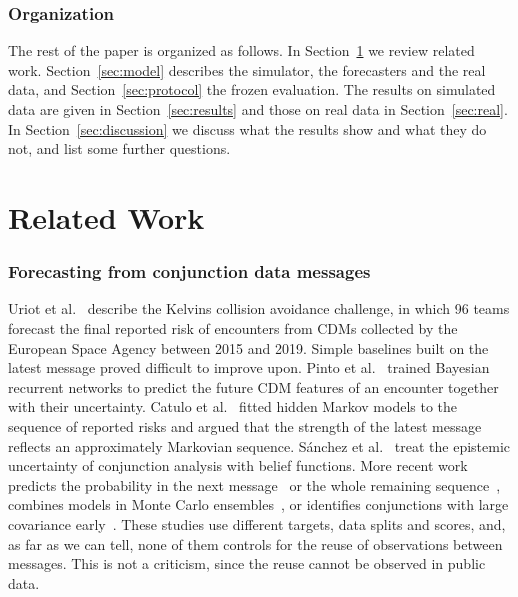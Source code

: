 \documentclass[conference]{IEEEtran}
\begin{document}
\subsubsection*{Organization}
The rest of the paper is organized as follows. In Section~\ref{sec:related} we review related work. Section~\ref{sec:model} describes the simulator, the forecasters and the real data, and Section~\ref{sec:protocol} the frozen evaluation. The results on simulated data are given in Section~\ref{sec:results} and those on real data in Section~\ref{sec:real}. In Section~\ref{sec:discussion} we discuss what the results show and what they do not, and list some further questions.

\section{Related Work}\label{sec:related}

\subsubsection*{Forecasting from conjunction data messages}
Uriot et al.~\cite{uriot2022} describe the Kelvins collision avoidance challenge, in which 96 teams forecast the final reported risk of encounters from CDMs collected by the European Space Agency between 2015 and 2019. Simple baselines built on the latest message proved difficult to improve upon. Pinto et al.~\cite{pinto2020} trained Bayesian recurrent networks to predict the future CDM features of an encounter together with their uncertainty. Catulo et al.~\cite{catulo2023} fitted hidden Markov models to the sequence of reported risks and argued that the strength of the latest message reflects an approximately Markovian sequence. S\'anchez et al.~\cite{sanchez2024cec,sanchez2024asr} treat the epistemic uncertainty of conjunction analysis with belief functions. More recent work predicts the probability in the next message~\cite{tok2026} or the whole remaining sequence~\cite{zerrouki2026}, combines models in Monte Carlo ensembles~\cite{ouari2026}, or identifies conjunctions with large covariance early~\cite{olson2026}. These studies use different targets, data splits and scores, and, as far as we can tell, none of them controls for the reuse of observations between messages. This is not a criticism, since the reuse cannot be observed in public data.
\end{document}
